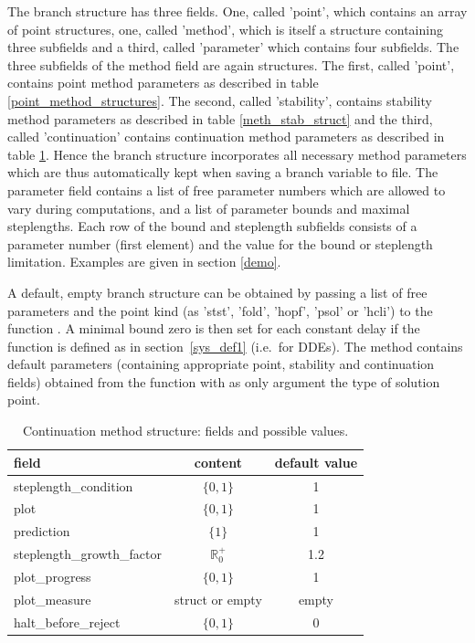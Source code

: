 \documentclass[10pt]{article}
\gdef \file#1{{\bfseries{\ttfamily{#1}}}}
\gdef \RR{{\mathbb R}}
\begin{document}
{The branch structure has three fields. One, called 'point', which
contains an array of point structures, one, called 'method',
which is itself a structure containing three subfields and
a third, called 'parameter' which contains four subfields.
The three subfields of the method field are
again structures. The first, called 'point', contains point method
parameters as described in table \ref{point_method_structures}. 
The second, called 'stability',
contains stability method parameters as described in 
table \ref{meth_stab_struct} and
the third, called 
'continuation' contains continuation method parameters as
described in table \ref{continuation_structure}.
Hence the branch structure incorporates all necessary method
parameters which are thus 
automatically kept when saving a branch variable to file.
The parameter field contains a list of free parameter numbers
which are allowed to vary during computations, and a list of parameter
bounds and maximal steplengths. Each row of the bound and steplength
subfields consists of a parameter number (first element) and
the value for the bound or steplength limitation. Examples are
given in section \ref{demo}.

A default, empty branch structure can be obtained by passing
a list of free parameters and the point kind 
(as 'stst', 'fold', 'hopf', 'psol' or 'hcli')
to the function \file{df\_brnch}. A minimal bound zero is then set
for each constant delay if the function \file{sys\_tau} is defined
as in section~\ref{sys_def1} (i.e.~for DDEs). The method contains 
default parameters
(containing appropriate point, stability and continuation fields)
obtained from the function \file{df\_mthod} with as only argument the type
of solution point.

\begin{table}
\begin{center}
\begin{tabular}{l|c|c}
field                      & content         & default value  \\\hline 
steplength\_condition      & $\{0,1\}$       & 1     \\
plot                       & $\{0,1\}$       & 1     \\
prediction                 & $\{1\}$         & 1     \\
steplength\_growth\_factor & $\RR^+_0$       & 1.2   \\
plot\_progress             & $\{0,1\}$       & 1     \\
plot\_measure              & struct or empty & empty \\
halt\_before\_reject       & $\{0,1\}$       & 0
\end{tabular}
\end{center}
\caption{\small\label{continuation_structure}
Continuation method structure: fields and possible values.}
\end{table}

}
\end{document}

